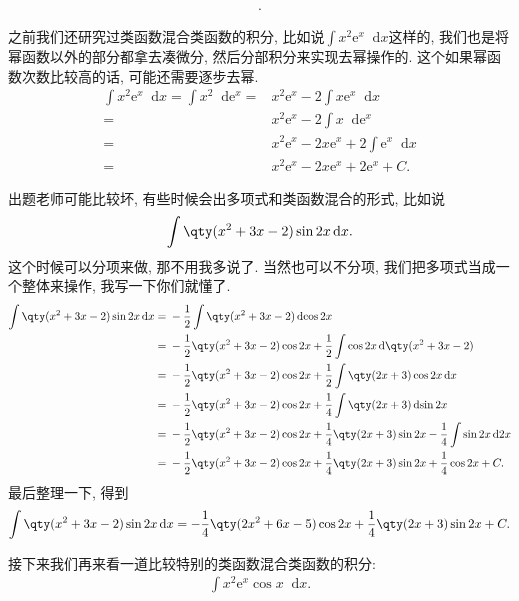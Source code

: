 \documentclass{ctexbook}
\newcommand{\e}{\mathrm{e}}
\newcommand*{\dif}{\mathop{}\!\mathrm{d}}
\begin{document}
{\begin{align*}
.\end{align*}\par
之前我们还研究过\uppercase\expandafter{}类函数混合\uppercase\expandafter{}类函数的积分, 比如说$\int x^{2}\e^{x}\dif{x}$这样的, 我们也是将幂函数以外的部分都拿去凑微分, 然后分部积分来实现去幂操作的. 这个如果幂函数次数比较高的话, 可能还需要逐步去幂. 
\begin{align*}
\int x^{2}\e^{x}\dif{x}=\int x^{2}\dif{\e^{x}}={}&x^{2}\e^{x}-2\int x\e^{x}\dif{x}\\
={}&x^{2}\e^{x}-2\int x\dif{\e^{x}}\\
={}&x^{2}\e^{x}-2x\e^{x}+2\int\e^{x}\dif{x}\\
={}&x^{2}\e^{x}-2x\e^{x}+2\e^{x}+C
.\end{align*}\par
出题老师可能比较坏, 有些时候会出多项式和\uppercase\expandafter{}类函数混合的形式, 比如说
\begin{align*}
\int\qty(x^{2}+3x-2)\sin{2x}\dif{x}
.\end{align*}
这个时候可以分项来做, 那不用我多说了. 当然也可以不分项, 我们把多项式当成一个整体来操作, 我写一下你们就懂了. 
\begin{align*}
\int\qty(x^{2}+3x-2)\sin{2x}\dif{x}={}&-\frac{1}{2}\int\qty(x^{2}+3x-2)\dif{\cos{2x}}\\
={}&-\frac{1}{2}\qty(x^{2}+3x-2)\cos{2x}+\frac{1}{2}\int\cos{2x}\dif{\qty(x^{2}+3x-2)}\\
={}&-\frac{1}{2}\qty(x^{2}+3x-2)\cos{2x}+\frac{1}{2}\int\qty(2x+3)\cos{2x}\dif{x}\\
={}&-\frac{1}{2}\qty(x^{2}+3x-2)\cos{2x}+\frac{1}{4}\int\qty(2x+3)\dif{\sin{2x}}\\
={}&-\frac{1}{2}\qty(x^{2}+3x-2)\cos{2x}+\frac{1}{4}\qty(2x+3)\sin{2x}-\frac{1}{4}\int\sin{2x}\dif{2x}\\
={}&-\frac{1}{2}\qty(x^{2}+3x-2)\cos{2x}+\frac{1}{4}\qty(2x+3)\sin{2x}+\frac{1}{4}\cos{2x}+C
.\end{align*}
最后整理一下, 得到
\begin{align*}
\int\qty(x^{2}+3x-2)\sin{2x}\dif{x}=-\frac{1}{4}\qty(2x^{2}+6x-5)\cos{2x}+\frac{1}{4}\qty(2x+3)\sin{2x}+C
.\end{align*}\par
接下来我们再来看一道比较特别的\uppercase\expandafter{}类函数混合\uppercase\expandafter{}类函数的积分: 
\begin{align*}
\int x^{2}\e^{x}\cos{x}\dif{x}
.\end{align*}
}
\end{document}
